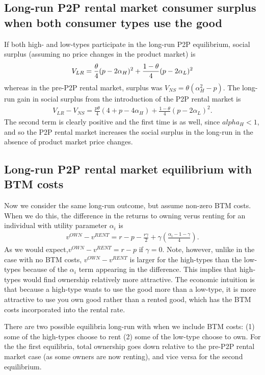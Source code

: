 \documentclass[11pt]{article}
\begin{document}
\subsection{Long-run P2P rental market consumer surplus when both consumer types use the good} 
If both high- and low-types participate in the long-run P2P equilibrium, social surplus (assuming no price changes in the product market) is 
\begin{align} 
V_{LR} & = \frac{\theta}{4}(p - 2\alpha_H)^2 + \frac{1-\theta}{4}(p - 2\alpha_L)^2 \notag \\
\end{align} 
whereas in the pre-P2P rental market, surplus was $V_{NS} = \theta(\alpha_H^2 - p)$.  
The long-run gain in social surplus from the introduction of the P2P rental market is  
\begin{align}
V_{LR} - V_{NS} = \frac{p\theta}{4}(4 + p - 4 \alpha_H) + \frac{1-\theta}{4}(p - 2\alpha_L)^2. 
\end{align}
The second term is clearly positive and the first time is as well, since $alpha_H < 1$, and so the P2P rental market increases the social surplus in the long-run in the absence of product market price changes. 

\subsection{Long-run P2P rental market equilibrium with BTM costs}
Now we consider the same long-run outcome, but assume non-zero BTM costs.
When we do this, the difference in the returns to owning verus renting for an individual with utility parameter $\alpha_i$  is 
\begin{align}
  v^{OWN} - v^{RENT} = r - p - \frac{r\gamma}{2} + \gamma \left( \frac{\alpha_i - 1 - \gamma}{4} \right). 
\end{align}
As we would expect,$v^{OWN} - v^{RENT} = r - p$ if $\gamma = 0$. 
Note, however, unlike in the case with no BTM costs, $v^{OWN} - v^{RENT}$ is larger for the high-types than the low-types because of the $\alpha_i$ term appearing in the difference.
This implies that high-types would find ownership relatively more attractive.
The economic intuition is that because a high-type wants to use the good more than a low-type, it is more attractive to use you own good rather than a rented good, which has the BTM costs incorporated into the rental rate. 

There are two possible equilibria long-run with when we include BTM costs:
(1) some of the high-types choose to rent 
(2) some of the low-type choose to own. 
For the the first equilibria, total ownership goes down relative to the pre-P2P rental market case (as some owners are now renting), and vice versa for the second equilibrium. 
\end{document}
